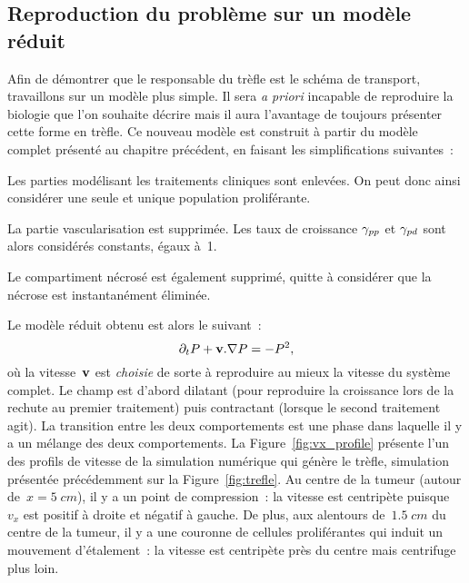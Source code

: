 \documentclass[main.tex]{subfiles}
\begin{document}
\subsection{Reproduction du problème sur un modèle réduit}
Afin de démontrer que le responsable du trèfle est le schéma de transport, travaillons sur un modèle plus simple.%
Il sera \textit{a priori} incapable de reproduire la biologie que l'on souhaite décrire mais il aura l'avantage de toujours présenter cette forme en trèfle. 
Ce nouveau modèle est construit à partir du modèle complet présenté au chapitre précédent, en faisant les simplifications suivantes~:
\begin{myitemize}
\item Les parties modélisant les traitements cliniques sont enlevées. On peut donc ainsi considérer une seule et unique population proliférante.
\item La partie vascularisation est supprimée. Les taux de croissance $\gamma_{pp}$ et $\gamma_{pd}$ sont alors considérés constants, égaux à~1.
\item Le compartiment nécrosé est également supprimé, quitte à considérer que la nécrose est instantanément éliminée.
\end{myitemize}
Le modèle réduit obtenu est alors le suivant~:
\begin{equation}\label{eq:mod_reduit_test_transp}
\partial_t P + \mathbf{v}.\nabla P = -P^2,
\end{equation}
où la vitesse~$\mathbf{v}$ est \emph{choisie} de sorte à reproduire au mieux la vitesse du système complet. Le champ est d'abord dilatant (pour reproduire la croissance lors de la rechute au premier traitement) puis contractant (lorsque le second traitement agit). La transition entre les deux comportements est une phase dans laquelle il y a un mélange des deux comportements. 
La Figure~\ref{fig:vx_profile} présente l'un des profils de vitesse de la simulation numérique qui génère le trèfle, simulation présentée précédemment  sur la Figure~\ref{fig:trefle}. 
Au centre de la tumeur (autour de~$x=5\;cm$), il y a un point de compression~: 
la vitesse est centripète puisque~$v_x$ est positif à droite et négatif à gauche. 
De plus, aux alentours de~$1.5\;cm$ du centre de la tumeur, il y a une couronne de cellules proliférantes qui induit un mouvement d'étalement~: la vitesse est centripète près du centre mais centrifuge plus loin. 
\end{document}
